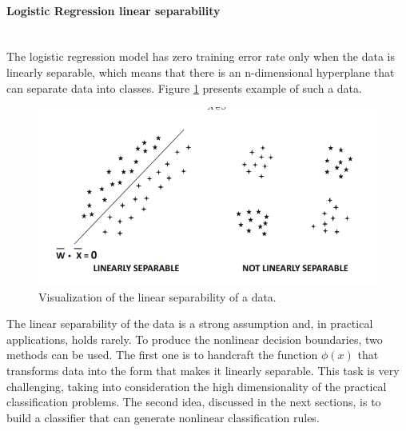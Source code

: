 \paragraph{Logistic Regression linear separability} \mbox{}
\\

The logistic regression model has zero training error rate only when the data is linearly separable, which means that there is an n-dimensional hyperplane that can separate data into classes. Figure \ref{fig:linear separability} presents example of such a data.



\begin{figure}[!h]
\centering
\includegraphics{figures/limear_separability.PNG}
\caption{Visualization of the linear separability of a data.  
\label{fig:linear separability}}
\end{figure}


The linear separability of the data is a strong assumption and, in practical applications, holds rarely. To produce the nonlinear decision boundaries, two methods can be used. The first one is to handcraft the function $\phi(x)$ that transforms data into the form that makes it linearly separable. This task is very challenging, taking into consideration the high dimensionality of the practical classification problems. The second idea, discussed in the next sections, is to build a classifier that can generate nonlinear classification rules. 

